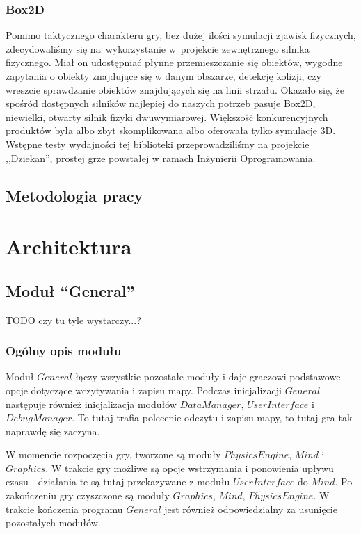 \documentclass[licencjacka]{pracamgr}
\begin{document}
    \subsection{Box2D}
    Pomimo taktycznego charakteru gry, bez dużej ilości symulacji zjawisk fizycznych, zdecydowaliśmy się na~wykorzystanie 
    w~projekcie zewnętrznego silnika fizycznego. Miał on udostępniać płynne przemieszczanie się obiektów, wygodne 
    zapytania o obiekty znajdujące się w danym obszarze, detekcję kolizji, czy wreszcie sprawdzanie obiektów
    znajdujących się na linii strzału. Okazało się, że spośród dostępnych silników najlepiej do naszych potrzeb pasuje 
    Box2D, niewielki, otwarty silnik fizyki dwuwymiarowej. Większość konkurencyjnych produktów była albo zbyt skomplikowana albo oferowała
    tylko symulacje 3D. Wstępne testy wydajności tej biblioteki przeprowadziliśmy na projekcie ,,Dziekan'', prostej grze 
    powstałej w ramach Inżynierii Oprogramowania.

  \section{Metodologia pracy}

\chapter{Architektura}
  \section{Moduł ``General''}
    TODO czy tu tyle wystarczy...?
    \subsection{Ogólny opis modułu}
      Moduł $General$ łączy wszystkie pozostałe moduły i daje graczowi podstawowe opcje dotyczące wczytywania i zapisu
      mapy. Podczas inicjalizacji $General$ następuje również inicjalizacja modułów $DataManager$, $UserInterface$ i
      $DebugManager$. To tutaj trafia polecenie odczytu i zapisu mapy, to tutaj gra tak naprawdę się zaczyna.

      W momencie rozpoczęcia gry, tworzone są moduły $PhysicsEngine$, $Mind$ i $Graphics$. W trakcie gry możliwe są
      opcje wstrzymania i ponowienia upływu czasu - działania te są tutaj przekazywane z modułu $UserInterface$ do
      $Mind$. Po zakończeniu gry czyszczone są moduły $Graphics$, $Mind$, $PhysicsEngine$. W trakcie kończenia programu
      $General$ jest również odpowiedzialny za usunięcie pozostałych modułów.
\end{document}
